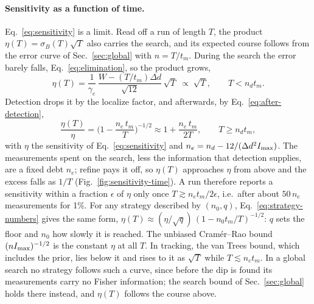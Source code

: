 \paragraph{Sensitivity as a function of time.} Eq.~\eqref{eq:sensitivity} is a limit. Read off a run of length $T$,
the product $\eta(T)=\sigma_B(T)\sqrt T$ also carries the search, and its expected course follows from the error
curve of Sec.~\ref{sec:global} with $n=T/t_m$. During the search the error barely falls, Eq.~\eqref{eq:elimination},
so the product grows,
\begin{equation*}
  \eta(T)=\frac{1}{\gamma_e}\,\frac{W-(T/t_m)\Delta d}{\sqrt{12}}\,\sqrt T\;\propto\;\sqrt T,\qquad T<n_d t_m .
\end{equation*}
Detection drops it by the localize factor, and afterwards, by Eq.~\eqref{eq:after-detection},
\begin{equation}
  \frac{\eta(T)}{\eta}=\Big(1-\frac{n_e\,t_m}{T}\Big)^{-1/2}\approx1+\frac{n_e\,t_m}{2T},
  \qquad T\ge n_d t_m ,
  \label{eq:sensitivity-time}
\end{equation}
with $\eta$ the sensitivity of Eq.~\eqref{eq:sensitivity} and $n_e=n_d-12/(\Delta d^2 I_{\rm max})$. The measurements spent on the search, less the information
that detection supplies, are a fixed debt $n_e$; refine pays it off, so $\eta(T)$ approaches $\eta$ from above and the
excess falls as $1/T$ (Fig.~\ref{fig:sensitivity-time}). A run therefore reports a sensitivity within a fraction
$\epsilon$ of $\eta$ only once $T\gtrsim n_e t_m/2\epsilon$, i.e.\ after about $50\,n_e$ measurements for 1\%. For any
strategy described by $(n_0,q)$, Eq.~\eqref{eq:strategy-numbers} gives the same form,
$\eta(T)\approx(\eta/\sqrt q)\,(1-n_0t_m/T)^{-1/2}$: $q$ sets the floor and $n_0$ how slowly it is reached. The
unbiased Cram\'er--Rao bound $(nI_{\rm max})^{-1/2}$ is the constant $\eta$ at all $T$. In tracking, the van Trees
bound, which includes the prior, lies below it and rises to it as $\sqrt T$ while $T\lesssim n_c t_m$. In a global
search no strategy follows such a curve, since before the dip is found its measurements carry no Fisher information;
the search bound of Sec.~\ref{sec:global} holds there instead, and $\eta(T)$ follows the course above.


